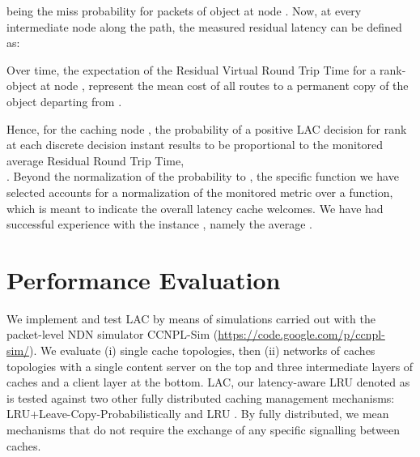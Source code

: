\documentclass[conference]{IEEEtran}
\begin{document}
 being the miss probability for packets of object  at node .
Now, at every intermediate node  along the path, the measured residual latency can be defined as:

Over time, the expectation of the Residual Virtual Round Trip Time for a rank- 
object at node ,  represent the mean cost of all routes 
to a permanent copy of the object departing from . 

Hence, for the caching node , the probability of a positive LAC decision for rank  at each discrete decision instant  results to be proportional to the monitored average Residual Round Trip Time, \\
.
Beyond the normalization of the probability to , the specific function we have selected accounts for a normalization of the monitored metric over a function,   which is meant to indicate the overall latency cache  welcomes. 
We have had successful experience with the instance , namely the average
.


\section{Performance Evaluation}
\label{sec:performance_evaluation}

We implement and test LAC by means of simulations carried out with the packet-level NDN simulator CCNPL-Sim (\url{https://code.google.com/p/ccnpl-sim/}). We evaluate (i) single cache topologies, then (ii) networks of caches topologies with a single content server on the top and three intermediate layers of caches and a client layer at the bottom.
LAC, our latency-aware LRU denoted as  is tested against two other fully distributed caching management mechanisms: LRU+Leave-Copy-Probabilistically and LRU \cite{1395054}\cite{643}. By fully distributed, we mean mechanisms that do not require the exchange of any specific signalling between caches.
\end{document}
